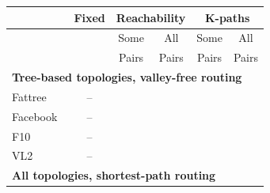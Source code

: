 \documentclass[numbers, 10pt, preprint]{sigplanconf}
\newcommand{\cmark}{\ding{51}}
\begin{document}
\begin{figure}[t!]
  \begin{center}
      \begin{tabular}{| l | c| c | c | c | c | }
      \hline
       & \textbf{Fixed} & \multicolumn{2}{|c|}{\textbf{Reachability}} & \multicolumn{2}{|c|}{\textbf{K-paths}} \\ \hline
      & & Some & All & Some & All \\
      & & Pairs & Pairs & Pairs & Pairs \\ \hline

      \multicolumn{6}{l}{\textbf{Tree-based topologies, valley-free routing}} \\ \hline

      Fattree~\cite{fattree} & -- & \cmark & \cmark & \cmark & \cmark  \\ \hline
      Facebook~\cite{facebook-fattree} & -- & \cmark & \cmark & \cmark & \cmark \\ \hline
      F10~\cite{f10-fattree} & -- & \cmark & \cmark & \cmark & \cmark \\ \hline
      VL2~\cite{vl2-fattree} & -- & \cmark & \cmark & \cmark & \cmark \\ \hline
%

      \multicolumn{6}{l}{\textbf{All topologies, shortest-path routing}} \\ \hline


\end{tabular}
\end{center}
\end{figure}
\end{document}
